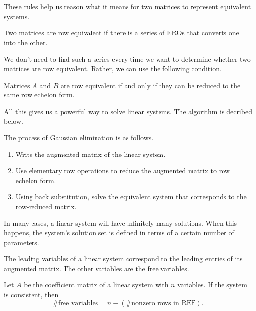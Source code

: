 \documentclass[../m073main.tex]{subfiles}
\begin{document}
These rules help us reason what it means for two matrices to represent equivalent systems.

\begin{definition}
	Two matrices are row equivalent if there is a series of EROs that converts one into the other.
\end{definition}

We don't need to find such a series every time we want to determine whether two matrices are row equivalent.
Rather, we can use the following condition.

\begin{theorem}
	Matrices $A$ and $B$ are row equivalent if and only if they can be reduced to the same row echelon form.
\end{theorem}

All this gives us a powerful way to solve linear systems.
The algorithm is decribed below.

\begin{definition}
	The process of Gaussian elimination is as follows.
	\begin{enumerate}
		\item Write the augmented matrix of the linear system.
		\item Use elementary row operations to reduce the augmented matrix to row echelon form.
		\item Using back substitution, solve the equivalent system that corresponds to the row-reduced matrix.
	\end{enumerate}
\end{definition}

In many cases, a linear system will have infinitely many solutions.
When this happens, the system's solution set is defined in terms of a certain number of parameters.

\begin{definition}
	The leading variables of a linear system correspond to the leading entries of its augmented matrix.
	The other variables are the free variables.
\end{definition}

\begin{theorem}
	Let $A$ be the coefficient matrix of a linear system with $n$ variables.
	If the system is consistent, then
	\[ \text{\# free variables} = n - (\text{\# nonzero rows in REF}). \]
\end{theorem}
\end{document}
